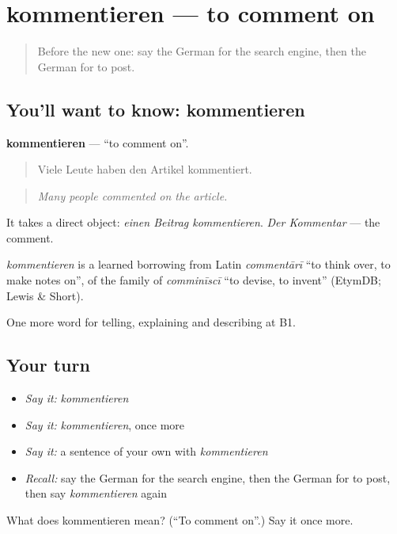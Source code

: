 \section[kommentieren]{kommentieren — to comment on}

\label{lesson:GE-C394-kommentieren}



\begin{quote}
Before the new one: say the German for the search engine, then the German for to post.
\end{quote}

\subsection*{You'll want to know: kommentieren}
\textbf{kommentieren} — \textquotedblleft{}to comment on\textquotedblright{}.

\begin{quote}
Viele Leute haben den Artikel kommentiert.
\end{quote}

\begin{quote}
\emph{Many people commented on the article.}
\end{quote}

It takes a direct object: \emph{einen Beitrag kommentieren}. \emph{Der Kommentar} — the comment.

\begin{cousinweb}
\emph{kommentieren} is a learned borrowing from Latin \emph{commentārī} \textquotedblleft{}to think over, to make notes on\textquotedblright{}, of the family of \emph{comminīscī} \textquotedblleft{}to devise, to invent\textquotedblright{} (EtymDB; Lewis \& Short).
\end{cousinweb}

\begin{grammarlens}[title={What you've built}]
One more word for telling, explaining and describing at B1.
\end{grammarlens}

\subsection*{Your turn}
\begin{itemize}
\raggedright
  \item \emph{Say it:} \emph{kommentieren}
  \item \emph{Say it:} \emph{kommentieren}, once more
  \item \emph{Say it:} a sentence of your own with \emph{kommentieren}
  \item \emph{Recall:} say the German for the search engine, then the German for to post, then say \emph{kommentieren} again
\end{itemize}

\begin{tcolorbox}[breakable,colback=teal!4,colframe=teal!35!black,title={Before you move on}]
What does kommentieren mean? (\textquotedblleft{}To comment on\textquotedblright{}.) Say it once more.
\end{tcolorbox}
